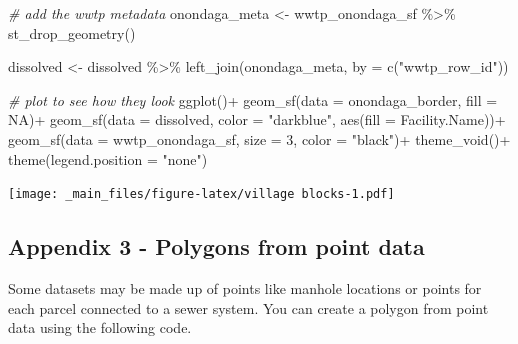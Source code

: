 \documentclass[
]{book}
\newenvironment{Shaded}{\begin{snugshade}}{\end{snugshade}}
\newcommand{\AttributeTok}[1]{\textcolor[rgb]{0.77,0.63,0.00}{#1}}
\newcommand{\CommentTok}[1]{\textcolor[rgb]{0.56,0.35,0.01}{\textit{#1}}}
\newcommand{\ConstantTok}[1]{\textcolor[rgb]{0.00,0.00,0.00}{#1}}
\newcommand{\DecValTok}[1]{\textcolor[rgb]{0.00,0.00,0.81}{#1}}
\newcommand{\FunctionTok}[1]{\textcolor[rgb]{0.00,0.00,0.00}{#1}}
\newcommand{\NormalTok}[1]{#1}
\newcommand{\OtherTok}[1]{\textcolor[rgb]{0.56,0.35,0.01}{#1}}
\newcommand{\SpecialCharTok}[1]{\textcolor[rgb]{0.00,0.00,0.00}{#1}}
\newcommand{\StringTok}[1]{\textcolor[rgb]{0.31,0.60,0.02}{#1}}
\begin{document}
\begin{Shaded}
\begin{Highlighting}[]
\CommentTok{\# add the wwtp metadata}
\NormalTok{onondaga\_meta }\OtherTok{\textless{}{-}}\NormalTok{ wwtp\_onondaga\_sf }\SpecialCharTok{\%\textgreater{}\%}
  \FunctionTok{st\_drop\_geometry}\NormalTok{() }

\NormalTok{dissolved }\OtherTok{\textless{}{-}}\NormalTok{ dissolved }\SpecialCharTok{\%\textgreater{}\%}
  \FunctionTok{left\_join}\NormalTok{(onondaga\_meta, }\AttributeTok{by =} \FunctionTok{c}\NormalTok{(}\StringTok{"wwtp\_row\_id"}\NormalTok{))}

\CommentTok{\# plot to see how they look}
\FunctionTok{ggplot}\NormalTok{()}\SpecialCharTok{+}
  \FunctionTok{geom\_sf}\NormalTok{(}\AttributeTok{data =}\NormalTok{ onondaga\_border, }\AttributeTok{fill =} \ConstantTok{NA}\NormalTok{)}\SpecialCharTok{+}
  \FunctionTok{geom\_sf}\NormalTok{(}\AttributeTok{data =}\NormalTok{ dissolved, }\AttributeTok{color =} \StringTok{"darkblue"}\NormalTok{, }\FunctionTok{aes}\NormalTok{(}\AttributeTok{fill =} \StringTok{\textasciigrave{}}\AttributeTok{Facility.Name}\StringTok{\textasciigrave{}}\NormalTok{))}\SpecialCharTok{+}
  \FunctionTok{geom\_sf}\NormalTok{(}\AttributeTok{data =}\NormalTok{ wwtp\_onondaga\_sf, }\AttributeTok{size =} \DecValTok{3}\NormalTok{, }\AttributeTok{color =} \StringTok{"black"}\NormalTok{)}\SpecialCharTok{+}
  \FunctionTok{theme\_void}\NormalTok{()}\SpecialCharTok{+}
  \FunctionTok{theme}\NormalTok{(}\AttributeTok{legend.position =} \StringTok{"none"}\NormalTok{)}
\end{Highlighting}
\end{Shaded}

\texttt{[image: \_main\_files/figure-latex/village blocks-1.pdf]}

\hypertarget{appendix-3---polygons-from-point-data}{%
\subsection{Appendix 3 - Polygons from point data}\label{appendix-3---polygons-from-point-data}}

Some datasets may be made up of points like manhole locations or points for each parcel connected to a sewer system. You can create a polygon from point data using the following code.
\end{document}

